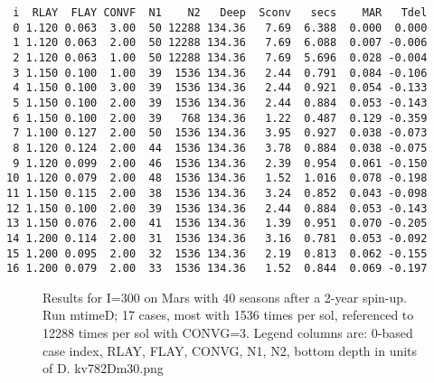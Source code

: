 \documentclass{article}
\begin{document}
\begin{table} 
\caption[Tuning cases]{Cases for the tuning run. 'Deep' is depth to the bottom
  in units of D; 'Sconv' is the average convergence safety factor; 'secs' is the
  execution time for the case (all lats and seasons); MAR is the mean absolute
  residual of surface temperature for 30\qd S; 'Tdel' is the temperature
  difference at 7 Hours. The first 3 cases are identical except for CONVG, and
  are cases 3:5 3. Case 6 has 1/2 the time steps. Case 7 is similar to case 2,
  but must use a larger first layer and smaller RLAY because of the larger
  time-step. Last are 3 sets of constant RLAY, each with increasing number of
  layers. }  \label{tuneTab} 
\begin{verbatim}
 i  RLAY  FLAY CONVF  N1    N2   Deep  Sconv   secs    MAR   Tdel
 0 1.120 0.063  3.00  50 12288 134.36   7.69  6.388  0.000  0.000
 1 1.120 0.063  2.00  50 12288 134.36   7.69  6.088  0.007 -0.006
 2 1.120 0.063  1.00  50 12288 134.36   7.69  5.696  0.028 -0.004
 3 1.150 0.100  1.00  39  1536 134.36   2.44  0.791  0.084 -0.106
 4 1.150 0.100  3.00  39  1536 134.36   2.44  0.921  0.054 -0.133
 5 1.150 0.100  2.00  39  1536 134.36   2.44  0.884  0.053 -0.143
 6 1.150 0.100  2.00  39   768 134.36   1.22  0.487  0.129 -0.359
 7 1.100 0.127  2.00  50  1536 134.36   3.95  0.927  0.038 -0.073
 8 1.120 0.124  2.00  44  1536 134.36   3.78  0.884  0.038 -0.075
 9 1.120 0.099  2.00  46  1536 134.36   2.39  0.954  0.061 -0.150
10 1.120 0.079  2.00  48  1536 134.36   1.52  1.016  0.078 -0.198
11 1.150 0.115  2.00  38  1536 134.36   3.24  0.852  0.043 -0.098
12 1.150 0.100  2.00  39  1536 134.36   2.44  0.884  0.053 -0.143
13 1.150 0.076  2.00  41  1536 134.36   1.39  0.951  0.070 -0.205
14 1.200 0.114  2.00  31  1536 134.36   3.16  0.781  0.053 -0.092
15 1.200 0.095  2.00  32  1536 134.36   2.19  0.813  0.062 -0.155
16 1.200 0.079  2.00  33  1536 134.36   1.52  0.844  0.069 -0.197
\end{verbatim}
\vspace{-3.0mm}
\hrulefill \end{table}  
\begin{figure}[!ht] 
\caption[Tuning for accuracy]{Results for I=300 on Mars with 40 seasons after a
  2-year spin-up. Run mtimeD; 17 cases, most with 1536 times per sol, referenced
  to 12288 times per sol with CONVG=3. Legend columns are: 0-based case index,
  RLAY, FLAY, CONVG, N1, N2, bottom depth in units of D.
\label{kv782Dm30} kv782Dm30.png  }
\end{figure} 
\end{document}
